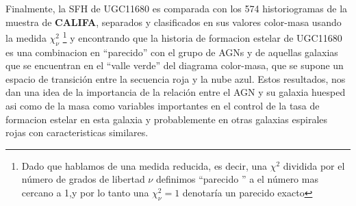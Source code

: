 \begin{abstracts}
Finalmente, la SFH de UGC11680  es comparada con los 574 historiogramas  de la muestra de \textbf{CALIFA}, separados y clasificados en sus valores color-masa usando la medida $\chi^2_{\nu}$ \footnote{Dado que hablamos de una medida reducida, es decir, una $\chi^2$ dividida por el número de grados de libertad $\nu$ definimos ``parecido '' a el número mas cercano a 1,y por lo tanto una $\chi^2_{\nu} =1 $ denotaría un parecido exacto} y encontrando que la historia de formacion estelar de UGC11680 es una combinacion en ``parecido'' 
con el grupo de AGNs  y de aquellas galaxias que se encuentran en el ``valle verde'' del diagrama color-masa, que se supone un espacio de transición 
entre la secuencia roja y la nube azul. Estos resultados, nos dan una idea de la importancia de la relación entre el AGN y su galaxia huesped
 asi como de la masa como variables importantes en el control de la tasa de formacion estelar en esta galaxia y probablemente en otras galaxias espirales rojas 
con caracteristicas similares.


\end{abstracts}


